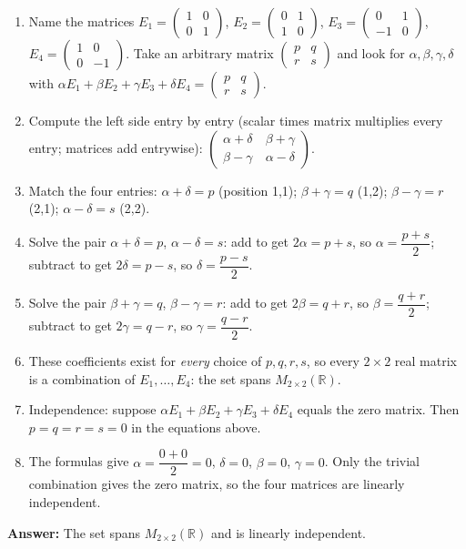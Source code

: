 \documentclass[11pt]{article}
\begin{document}
\begin{tcolorbox}[breakable,colback=ans,colframe=ansb,boxrule=0.5pt,left=4pt,right=4pt,top=2pt,bottom=2pt]\begin{enumerate}[leftmargin=2.2em,itemsep=1pt,topsep=1pt,label=\textbf{Step \arabic*.}]\item Name the matrices $E_1=\begin{pmatrix}1&0\\0&1\end{pmatrix}$, $E_2=\begin{pmatrix}0&1\\1&0\end{pmatrix}$, $E_3=\begin{pmatrix}0&1\\-1&0\end{pmatrix}$, $E_4=\begin{pmatrix}1&0\\0&-1\end{pmatrix}$. Take an arbitrary matrix $\begin{pmatrix}p&q\\r&s\end{pmatrix}$ and look for $\alpha,\beta,\gamma,\delta$ with $\alpha E_1+\beta E_2+\gamma E_3+\delta E_4=\begin{pmatrix}p&q\\r&s\end{pmatrix}$.
\item Compute the left side entry by entry (scalar times matrix multiplies every entry; matrices add entrywise): $\begin{pmatrix}\alpha+\delta&\ \beta+\gamma\\ \beta-\gamma&\ \alpha-\delta\end{pmatrix}$.
\item Match the four entries: $\alpha+\delta=p$ (position 1,1); $\beta+\gamma=q$ (1,2); $\beta-\gamma=r$ (2,1); $\alpha-\delta=s$ (2,2).
\item Solve the pair $\alpha+\delta=p$, $\alpha-\delta=s$: add to get $2\alpha=p+s$, so $\alpha=\dfrac{p+s}{2}$; subtract to get $2\delta=p-s$, so $\delta=\dfrac{p-s}{2}$.
\item Solve the pair $\beta+\gamma=q$, $\beta-\gamma=r$: add to get $2\beta=q+r$, so $\beta=\dfrac{q+r}{2}$; subtract to get $2\gamma=q-r$, so $\gamma=\dfrac{q-r}{2}$.
\item These coefficients exist for \emph{every} choice of $p,q,r,s$, so every $2\times2$ real matrix is a combination of $E_1,\dots,E_4$: the set spans $M_{2\times2}(\mathbb{R})$.
\item Independence: suppose $\alpha E_1+\beta E_2+\gamma E_3+\delta E_4$ equals the zero matrix. Then $p=q=r=s=0$ in the equations above.
\item The formulas give $\alpha=\dfrac{0+0}{2}=0$, $\delta=0$, $\beta=0$, $\gamma=0$. Only the trivial combination gives the zero matrix, so the four matrices are linearly independent.
\end{enumerate}\textbf{Answer:} The set spans $M_{2\times2}(\mathbb{R})$ and is linearly independent.\end{tcolorbox}
\end{document}
